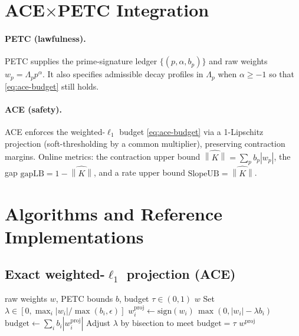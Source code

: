 \documentclass[11pt]{article}
\theoremstyle{definition}
\theoremstyle{remark}
\newcommand{\norm}[1]{\left\lVert #1\right\rVert}
\newcommand{\1}{\mathbf{1}}
\begin{document}
\section{ACE$\times$PETC Integration}
\paragraph{PETC (lawfulness).} PETC supplies the prime-signature ledger $\{(p,\alpha,b_p)\}$ and raw weights $w_p=\Lambda_p p^{\alpha}$. It also specifies admissible decay profiles in $\Lambda_p$ when $\alpha\ge -1$ so that \eqref{eq:ace-budget} still holds.

\paragraph{ACE (safety).} ACE enforces the weighted-$\ell_1$ budget \eqref{eq:ace-budget} via a 1-Lipschitz projection (soft-thresholding by a common multiplier), preserving contraction margins. Online metrics: the contraction upper bound $\widehat{\norm{K}}=\sum_p b_p|w_p|$, the gap $\mathrm{gapLB}=1-\widehat{\norm{K}}$, and a rate upper bound $\mathrm{SlopeUB}=\widehat{\norm{K}}$.

\section{Algorithms and Reference Implementations}
\subsection{Exact weighted-$\ell_1$ projection (ACE)}
\begin{algorithm}[H]
\caption{Weighted-$\ell_1$ projection by bisection}
\begin{algorithmic}[1]
\Require raw weights $w$, PETC bounds $b$, budget $\tau\in(0,1)$
 \State \Return $w$ \EndIf
\State Set $\lambda\in[0,\max_i |w_i|/\max(b_i,\epsilon)]$
  \State $w^{\mathrm{proj}}_i \leftarrow \mathrm{sign}(w_i)\,\max(0, |w_i|-\lambda b_i)$
  \State $\mathrm{budget}\leftarrow \sum_i b_i |w^{\mathrm{proj}}_i|$
  \State Adjust $\lambda$ by bisection to meet $\mathrm{budget}=\tau$
\EndWhile
\State \Return $w^{\mathrm{proj}}$
\end{algorithmic}
\end{algorithm}
\end{document}
